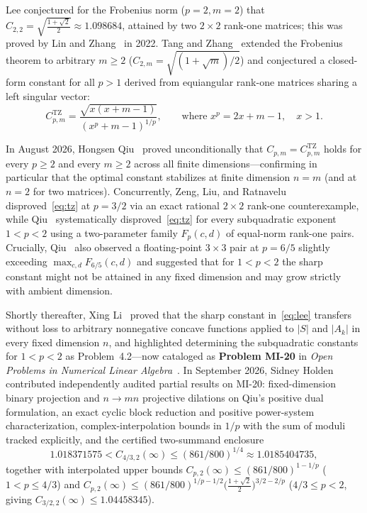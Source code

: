 \documentclass[10pt,letterpaper]{article}
\newcommand{\TZ}{\mathrm{TZ}}
\begin{document}
Lee conjectured for the Frobenius norm ($p = 2, m = 2$) that $C_{2,2} = \sqrt{\frac{1+\sqrt{2}}{2}} \approx 1.098684$, attained by two $2\times 2$ rank-one matrices; this was proved by Lin and Zhang~\cite{LinZhang2022} in 2022. Tang and Zhang~\cite{TangZhang2026} extended the Frobenius theorem to arbitrary $m \ge 2$ ($C_{2,m} = \sqrt{(1+\sqrt{m})/2}$) and conjectured a closed-form constant for all $p > 1$ derived from equiangular rank-one matrices sharing a left singular vector:
\begin{equation}\label{eq:tz}
  C_{p,m}^{\TZ} = \frac{\sqrt{x(x + m - 1)}}{(x^p + m - 1)^{1/p}},
  \qquad \text{where } x^p = 2x + m - 1,\quad x > 1.
\end{equation}

In August 2026, Hongsen Qiu~\cite{Qiu2026} proved unconditionally that $C_{p,m} = C_{p,m}^{\TZ}$ holds for every $p \ge 2$ and every $m \ge 2$ across all finite dimensions—confirming in particular that the optimal constant stabilizes at finite dimension $n = m$ (and at $n = 2$ for two matrices). Concurrently, Zeng, Liu, and Ratnavelu~\cite{Zeng2026} disproved~\eqref{eq:tz} at $p = 3/2$ via an exact rational $2\times 2$ rank-one counterexample, while Qiu~\cite{Qiu2026} systematically disproved~\eqref{eq:tz} for every subquadratic exponent $1 < p < 2$ using a two-parameter family $F_p(c,d)$ of equal-norm rank-one pairs. Crucially, Qiu~\cite[\S5]{Qiu2026} also observed a floating-point $3\times 3$ pair at $p = 6/5$ slightly exceeding $\max_{c,d} F_{6/5}(c,d)$ and suggested that for $1 < p < 2$ the sharp constant might not be attained in any fixed dimension and may grow strictly with ambient dimension.

Shortly thereafter, Xing Li~\cite{Li2026} proved that the sharp constant in~\eqref{eq:lee} transfers without loss to arbitrary nonnegative concave functions applied to $|S|$ and $|A_k|$ in every fixed dimension $n$, and highlighted determining the subquadratic constants for $1 < p < 2$ as Problem~4.2—now cataloged as \textbf{Problem MI-20} in \emph{Open Problems in Numerical Linear Algebra}~\cite{OpenProblemsNLA}. In September 2026, Sidney Holden~\cite{Holden2026a,Holden2026b} contributed independently audited partial results on MI-20: fixed-dimension binary projection and $n \to mn$ projective dilations on Qiu's positive dual formulation, an exact cyclic block reduction and positive power-system characterization, complex-interpolation bounds in $1/p$ with the sum of moduli tracked explicitly, and the certified two-summand enclosure
\[
  1.018371575 < C_{4/3,2}(\infty) \le (861/800)^{1/4} \approx 1.0185404735,
\]
together with interpolated upper bounds $C_{p,2}(\infty) \le (861/800)^{1-1/p}$ ($1 < p \le 4/3$) and $C_{p,2}(\infty) \le (861/800)^{1/p-1/2}\bigl(\frac{1+\sqrt{2}}{2}\bigr)^{3/2-2/p}$ ($4/3 \le p < 2$, giving $C_{3/2,2}(\infty) \le 1.04458345$).
\end{document}
